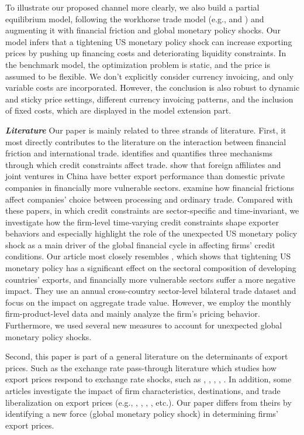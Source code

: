 To illustrate our proposed channel more clearly, we also build a partial equilibrium model, following the workhorse trade model (e.g., \cite{melitz2003impact} and \cite{manova2013credit}) and augmenting it with financial friction and global monetary policy shocks. Our model infers that a tightening US monetary policy shock can increase exporting prices by pushing up financing costs and deteriorating liquidity constraints. In the benchmark model, the optimization problem is static, and the price is assumed to be flexible. We don't explicitly consider currency invoicing, and only variable costs are incorporated. However, the conclusion is also robust to dynamic and sticky price settings, different currency invoicing patterns, and the inclusion of fixed costs, which are displayed in the model extension part.

\textbf{\textit{Literature}}
Our paper is mainly related to three strands of literature. First, it most directly contributes to the literature on the interaction between financial friction and international trade. \cite{manova2013credit} identifies and quantifies three mechanisms through which credit constraints affect trade. \cite{manova2015firm} show that foreign affiliates and joint ventures in China have better export performance than domestic private companies in financially more vulnerable sectors. \cite{manova2016firms}  examine how financial frictions affect companies' choice between processing and ordinary trade. Compared with these papers, in which credit constraints are sector-specific and time-invariant, we investigate how the firm-level time-varying credit constraints shape exporter behaviors and especially highlight the role of the unexpected US monetary policy shock as a main driver of the global financial cycle in affecting firms' credit conditions. Our article most closely resembles \cite{lin2018international}, which shows that tightening US monetary policy has a significant effect on the sectoral composition of developing countries' exports, and financially more vulnerable sectors suffer a more negative impact. They use an annual cross-country sector-level bilateral trade dataset and focus on the impact on aggregate trade value. However, we employ the monthly firm-product-level data and mainly analyze the firm's pricing behavior. Furthermore, we used several new measures to account for unexpected global monetary policy shocks. 

Second, this paper is part of a general literature on the determinants of export prices. Such as the exchange rate pass-through literature which studies how export prices respond to exchange rate shocks, such as \cite{obstfeld2000six}, \cite{amiti2014importers}, \cite{li2015exchange}, \cite{devereux2017importers}, \cite{auer2018quality}. In addition, some articles investigate the impact of firm characteristics, destinations, and trade liberalization on export prices (e.g., \cite{manova2012export}, \cite{fan2015credit}, \cite{harrigan2015export}, \cite{fan2015trade}, etc.). Our paper differs from theirs by identifying a new force (global monetary policy shock) in determining firms' export prices.

